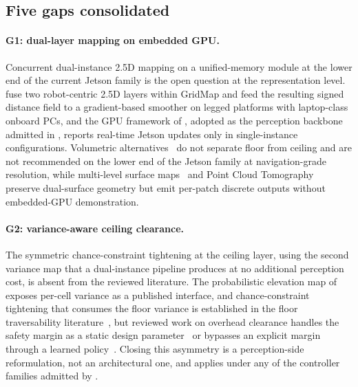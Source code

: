 \documentclass[11pt,a4paper]{article}
\begin{document}
\subsection{Five gaps consolidated}
\label{sec:synthesis:gaps}

\paragraph{G1: dual-layer mapping on embedded GPU.}
Concurrent dual-instance 2.5D mapping on a unified-memory module at the lower end of the current Jetson family is the open question at the representation level. \citet{buchananWalkingPostureAdaptation2019,PerceptiveWholebodyPlanning} fuse two robot-centric 2.5D layers within GridMap and feed the resulting signed distance field to a gradient-based smoother on legged platforms with laptop-class onboard PCs, and the GPU framework of \citet{mikiElevationMappingLocomotion2022}, adopted as the perception backbone admitted in , reports real-time Jetson updates only in single-instance configurations. Volumetric alternatives~\citep{OctoMapEfficientProbabilistic,millaneNvbloxGPUAcceleratedIncremental2024} do not separate floor from ceiling and are not recommended on the lower end of the Jetson family at navigation-grade resolution, while multi-level surface maps~\citep{lodhiTraversability_generator3dLibrary3D2026,MultiLevelSurfaceMaps} and Point Cloud Tomography~\citep{yangEfficientGlobalNavigational2024} preserve dual-surface geometry but emit per-patch discrete outputs without embedded-GPU demonstration.

\paragraph{G2: variance-aware ceiling clearance.}
The symmetric chance-constraint tightening at the ceiling layer, using the second variance map that a dual-instance pipeline produces at no additional perception cost, is absent from the reviewed literature. The probabilistic elevation map of \citet{fankhauserProbabilisticTerrainMapping2018} exposes per-cell variance as a published interface, and chance-constraint tightening that consumes the floor variance is established in the floor traversability literature~\citep{fanSTEPStochasticTraversability2021,bipedal_cp_2025}, but reviewed work on overhead clearance handles the safety margin as a static design parameter~\citep{buchananWalkingPostureAdaptation2019,DeformableConfigurationPlanning,aghaNeBulaQuestRobotic2021,tranzattoTeamCERBERUSWins2024} or bypasses an explicit margin through a learned policy~\citep{mikiLearningWalkConfined2024}. Closing this asymmetry is a perception-side reformulation, not an architectural one, and applies under any of the controller families admitted by .
\end{document}
